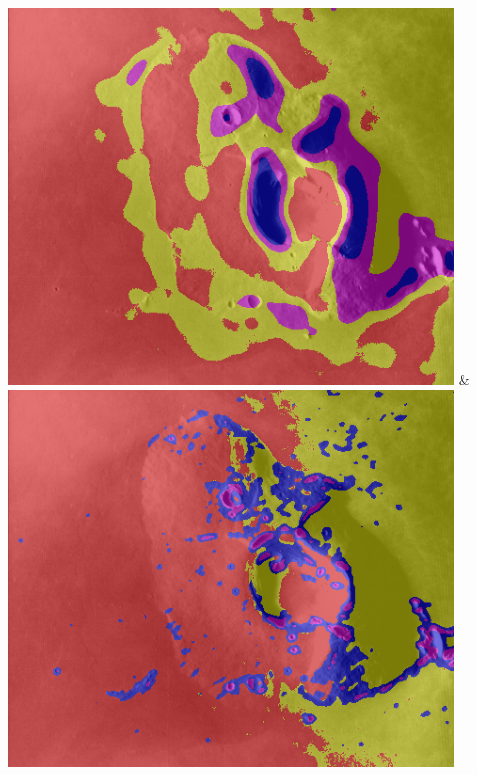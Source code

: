 \begin{table}[h!]
\begin{tabularx}{\textwidth}
		\includegraphics[width=.9\linewidth]{images/gen/filterbanks/Gre13_02.jpg_S.png} &
		\includegraphics[width=.9\linewidth]{images/gen/filterbanks/Gre13_02.jpg_MR.png} \\
		

\end{tabularx}
\end{table}
